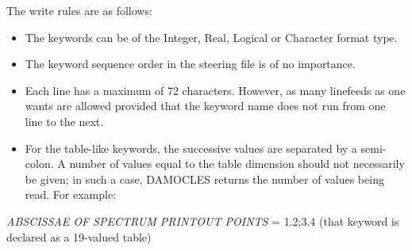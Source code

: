  The write rules are as follows:

\begin{itemize}
\item  The keywords can be of the Integer, Real, Logical or Character format type.

\item  The keyword sequence order in the steering file is of no importance.

\item  Each line has a maximum of 72 characters. However, as many linefeeds as one wants
  are allowed provided that the keyword name does not run from one line to the next.

\item  For the table-like keywords, the successive values are separated by a semi-colon.
  A number of values equal to the table dimension should not necessarily be given; in
  such a case, DAMOCLES returns the number of values being read. For example:
\end{itemize}

\textit{ABSCISSAE OF SPECTRUM PRINTOUT POINTS }= 1.2;3.4   (that keyword is declared
as a 19-valued table)

